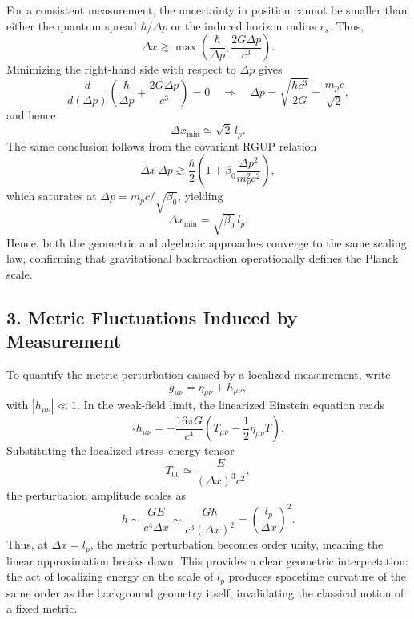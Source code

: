 \documentclass[11pt,oneside]{book}
\numberwithin{equation}{chapter}
\newcommand{\betaz}{\beta_0}
\begin{document}
For a consistent measurement, the uncertainty in position cannot be smaller than either the quantum spread $\hbar/\Delta p$ or the induced horizon radius $r_s$.  
Thus,
\begin{equation}
\Delta x \gtrsim \max\!\left(\frac{\hbar}{\Delta p}, \frac{2G\Delta p}{c^3}\right).
\end{equation}
Minimizing the right-hand side with respect to $\Delta p$ gives
\begin{equation}
\frac{d}{d(\Delta p)}\!\left(\frac{\hbar}{\Delta p} + \frac{2G\Delta p}{c^3}\right) = 0
\quad\Rightarrow\quad
\Delta p = \sqrt{\frac{\hbar c^3}{2G}} = \frac{m_p c}{\sqrt{2}},
\end{equation}
and hence
\begin{equation}
\Delta x_{\min} \simeq \sqrt{2}\,l_p.
\end{equation}
The same conclusion follows from the covariant RGUP relation
\begin{equation}
\Delta x\,\Delta p \gtrsim \frac{\hbar}{2}
\left(1 + \betaz\frac{\Delta p^2}{m_p^2 c^2}\right),
\end{equation}
which saturates at $\Delta p = m_p c/\sqrt{\betaz}$, yielding
\begin{equation}
\Delta x_{\min} = \sqrt{\betaz}\,l_p.
\end{equation}
Hence, both the geometric and algebraic approaches converge to the same scaling law, confirming that gravitational backreaction operationally defines the Planck scale.

\subsection*{3. Metric Fluctuations Induced by Measurement}

To quantify the metric perturbation caused by a localized measurement, write
\begin{equation}
g_{\mu\nu} = \eta_{\mu\nu} + h_{\mu\nu},
\end{equation}
with $|h_{\mu\nu}|\ll 1$.  
In the weak-field limit, the linearized Einstein equation reads
\begin{equation}
\square h_{\mu\nu} = -\frac{16\pi G}{c^4}
\left(T_{\mu\nu} - \frac{1}{2}\eta_{\mu\nu}T\right).
\end{equation}
Substituting the localized stress–energy tensor
\begin{equation}
T_{00} \simeq \frac{E}{(\Delta x)^3 c^2},
\end{equation}
the perturbation amplitude scales as
\begin{equation}
h \sim \frac{G E}{c^4 \Delta x}
\sim \frac{G\hbar}{c^3(\Delta x)^2}
= \left(\frac{l_p}{\Delta x}\right)^2.
\end{equation}
Thus, at $\Delta x = l_p$, the metric perturbation becomes order unity, meaning the linear approximation breaks down.  
This provides a clear geometric interpretation: the act of localizing energy on the scale of $l_p$ produces spacetime curvature of the same order as the background geometry itself, invalidating the classical notion of a fixed metric.
\end{document}
